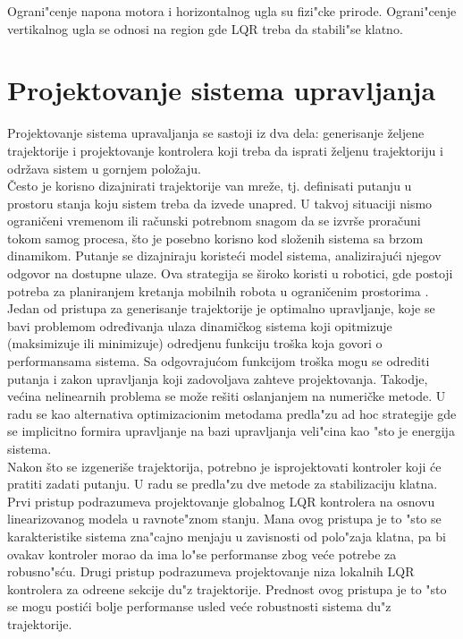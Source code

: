 \documentclass[a4paper,11pt]{article}
\theoremstyle{definition} \newtheorem{deff}{Definicija}[section]
\theoremstyle{definition} \newtheorem{prim}[deff]{Primer}
\theoremstyle{plain} \newtheorem{teor}[deff]{Teorema}
\begin{document}
	Ograni"cenje napona motora i horizontalnog ugla su fizi"cke prirode. Ograni"cenje vertikalnog ugla se odnosi na region gde LQR treba da stabili"se klatno.
	
	\clearpage
	
	
	\section{Projektovanje sistema upravljanja}
	
	Projektovanje sistema upravaljanja se sastoji iz dva dela: generisanje željene trajektorije i projektovanje kontrolera koji treba da isprati željenu trajektoriju i održava sistem u gornjem položaju. \\
	
	Često je korisno dizajnirati trajektorije van mreže, tj. definisati putanju u prostoru stanja koju sistem treba da izvede unapred. U takvoj situaciji nismo ograničeni vremenom ili računski potrebnom snagom da se izvrše proračuni tokom samog procesa, što je posebno korisno kod složenih sistema sa brzom dinamikom. Putanje se dizajniraju koristeći model sistema, analizirajući njegov odgovor na dostupne ulaze. Ova strategija se široko koristi u robotici, gde postoji potreba za planiranjem kretanja mobilnih robota u ograničenim prostorima \cite{inicijalna}. \\
	
	Jedan od pristupa za generisanje trajektorije je optimalno upravljanje,  koje se bavi problemom određivanja ulaza dinamičkog sistema koji opitmizuje (maksimizuje ili minimizuje) odredjenu funkciju troška koja govori o performansama sistema. Sa odgovrajućom funkcijom troška mogu se odrediti putanja i zakon upravljanja koji zadovoljava zahteve projektovanja. Takodje, većina nelinearnih problema se može rešiti oslanjanjem na numeričke metode. U radu se \cite{inicijalna} kao alternativa optimizacionim metodama predla"zu ad hoc strategije gde se implicitno formira upravljanje na bazi upravljanja veli"cina kao "sto je energija sistema. \\
	
	Nakon što se izgeneriše trajektorija, potrebno je isprojektovati kontroler koji će pratiti zadati putanju. U radu \cite{inicijalna} se predla"zu dve metode za stabilizaciju klatna. Prvi pristup podrazumeva projektovanje globalnog LQR kontrolera na osnovu linearizovanog modela u ravnote"znom stanju. Mana ovog pristupa je to "sto se karakteristike sistema zna"cajno menjaju u zavisnosti od polo"zaja klatna, pa bi ovakav kontroler morao da ima lo"se performanse zbog ve\'ce potrebe za robusno"s\'cu. Drugi pristup podrazumeva projektovanje niza lokalnih LQR kontrolera za odre\dj ene sekcije du"z trajektorije. Prednost ovog pristupa je to "sto se mogu posti\'ci bolje performanse usled ve\'ce robustnosti sistema du"z trajektorije.  \\[16pt]
	
\end{document}
